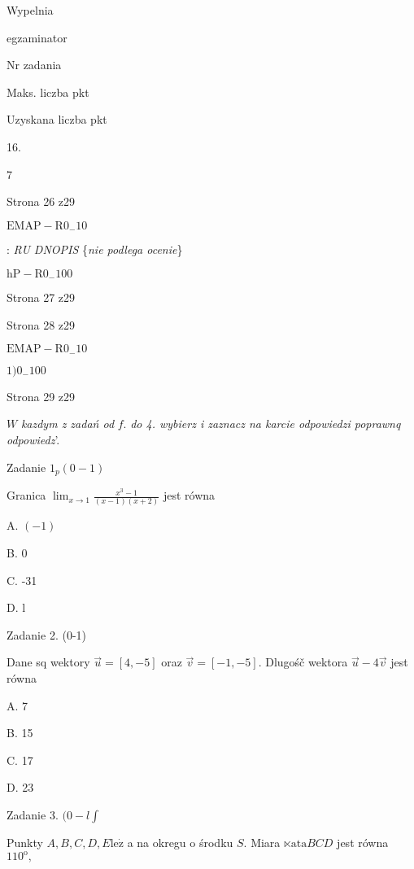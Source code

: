 \documentclass[a4paper,12pt]{article}
\begin{document}
Wypelnia

egzaminator

Nr zadania

Maks. liczba pkt

Uzyskana liczba pkt

16.

7

Strona 26 z29

$\mathrm{E}\mathrm{M}\mathrm{A}\mathrm{P}-\mathrm{R}0_{-}10$





: {\it RU DNOPIS} \{{\it nie podlega ocenie}\}

$\mathrm{h}\mathrm{P}-\mathrm{R}0_{-}100$

Strona 27 z29





Strona 28 z29

$\mathrm{E}\mathrm{M}\mathrm{A}\mathrm{P}-\mathrm{R}0_{-}10$





$1)0_{-}100$

Strona 29 z29










$W$ {\it kazdym z zadań od} $f.$ {\it do 4. wybierz i zaznacz na karcie odpowiedzi poprawnq odpowiedz}'.

Zadanie $1_{p}(0-1)$

Granica $\displaystyle \lim_{x\rightarrow 1}\frac{x^{3}-1}{(x-1)(x+2)}$ jest równa

A. $(-1)$

B. 0

C. -31

D. l

Zadanie 2. (0-1)

Dane sq wektory $\vec{u}=[4,-5]$ oraz $\vec{v}=[-1,-5]$. Dlugośč wektora $\vec{u}-4\vec{v}$ jest równa

A. 7

B. 15

C. 17

D. 23

Zadanie 3. $(0-l\displaystyle \int$

Punkty $A, B, C, D, E \mathrm{l}\mathrm{e}\dot{\mathrm{z}}$ a na okregu o środku $S$. Miara $\ltimes \mathrm{a}\mathrm{t}\mathrm{a} BCD$ jest równa $110^{\mathrm{o}},$
\end{document}
